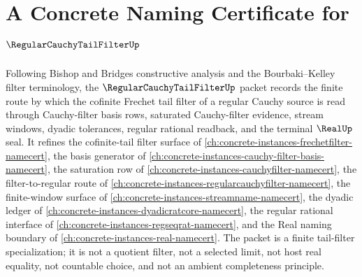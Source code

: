 \chapter{A Concrete Naming Certificate for $\RegularCauchyTailFilterUp$}
\label{ch:concrete-instances-regular-cauchy-tail-filter-namecert}

Following Bishop and Bridges constructive analysis and the Bourbaki--Kelley filter terminology, the $\RegularCauchyTailFilterUp$ packet records the finite route by which the cofinite Frechet tail filter of a regular Cauchy source is read through Cauchy-filter basis rows, saturated Cauchy-filter evidence, stream windows, dyadic tolerances, regular rational readback, and the terminal $\RealUp$ seal. It refines the cofinite-tail filter surface of \autoref{ch:concrete-instances-frechetfilter-namecert}, the basis generator of \autoref{ch:concrete-instances-cauchy-filter-basis-namecert}, the saturation row of \autoref{ch:concrete-instances-cauchyfilter-namecert}, the filter-to-regular route of \autoref{ch:concrete-instances-regularcauchyfilter-namecert}, the finite-window surface of \autoref{ch:concrete-instances-streamname-namecert}, the dyadic ledger of \autoref{ch:concrete-instances-dyadicratcore-namecert}, the regular rational interface of \autoref{ch:concrete-instances-regseqrat-namecert}, and the Real naming boundary of \autoref{ch:concrete-instances-real-namecert}. The packet is a finite tail-filter specialization; it is not a quotient filter, not a selected limit, not host real equality, not countable choice, and not an ambient completeness principle.

